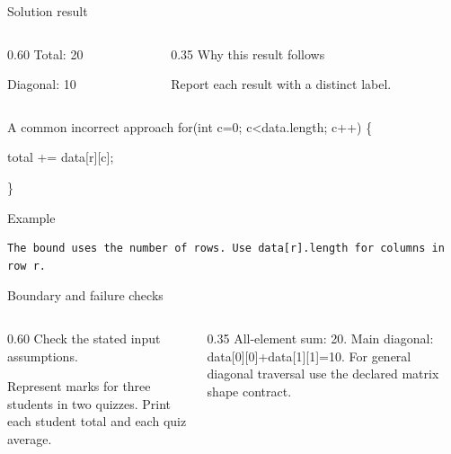\documentclass[10pt,aspectratio=169]{beamer}
\begin{document}
\begin{frame}[fragile,t]{Solution result}
\begin{columns}[T,onlytextwidth]\begin{column}{0.60\textwidth}
Total: 20\par Diagonal: 10
\end{column}\begin{column}{0.35\textwidth}\small
Why this result follows

Report each result with a distinct label.
\end{column}\end{columns}
\end{frame}

\begin{frame}[fragile,t]{A common incorrect approach}
for(int c=0; c\textless{}data.length; c++) \{\par   total += data[r][c];\par \}
\vspace{1mm}\begin{block}{Example}
\begin{lstlisting}
The bound uses the number of rows. Use data[r].length for columns in row r.
\end{lstlisting}
\end{block}
\end{frame}

\begin{frame}[fragile,t]{Boundary and failure checks}
\begin{columns}[T,onlytextwidth]\begin{column}{0.60\textwidth}
Check the stated input assumptions.

Represent marks for three students in two quizzes. Print each student total and each quiz average.
\end{column}\begin{column}{0.35\textwidth}\small
All-element sum: 20. Main diagonal: data[0][0]+data[1][1]=10. For general diagonal traversal use the declared matrix shape contract.
\end{column}\end{columns}
\end{frame}
\end{document}
